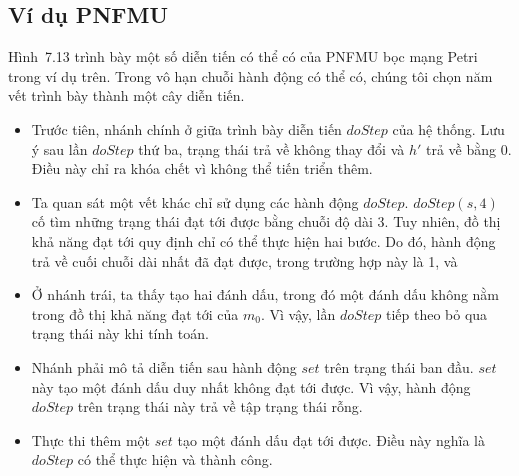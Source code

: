 \subsection{Ví dụ PNFMU}
Hình~7.13 trình bày một số diễn tiến có thể có của PNFMU bọc mạng Petri trong ví dụ trên. Trong vô hạn chuỗi hành động có thể có, chúng tôi chọn năm vết trình bày thành một cây diễn tiến.
\begin{itemize}
\item Trước tiên, nhánh chính ở giữa trình bày diễn tiến $doStep$ của hệ thống. Lưu ý sau lần $doStep$ thứ ba, trạng thái trả về không thay đổi và $h'$ trả về bằng 0. Điều này chỉ ra khóa chết vì không thể tiến triển thêm.
\item Ta quan sát một vết khác chỉ sử dụng các hành động $doStep$. $doStep(s,4)$ cố tìm những trạng thái đạt tới được bằng chuỗi độ dài 3. Tuy nhiên, đồ thị khả năng đạt tới quy định chỉ có thể thực hiện hai bước. Do đó, hành động trả về cuối chuỗi dài nhất đã đạt được, trong trường hợp này là 1, và
\item Ở nhánh trái, ta thấy tạo hai đánh dấu, trong đó một đánh dấu không nằm trong đồ thị khả năng đạt tới của $m_0$. Vì vậy, lần $doStep$ tiếp theo bỏ qua trạng thái này khi tính toán.
\item Nhánh phải mô tả diễn tiến sau hành động $set$ trên trạng thái ban đầu. $set$ này tạo một đánh dấu duy nhất không đạt tới được. Vì vậy, hành động $doStep$ trên trạng thái này trả về tập trạng thái rỗng.
\item Thực thi thêm một $set$ tạo một đánh dấu đạt tới được. Điều này nghĩa là $doStep$ có thể thực hiện và thành công.
\end{itemize}

